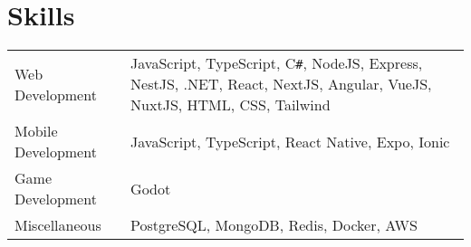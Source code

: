 \documentclass[a4paper,12pt]{article}
\begin{document}
\section{Skills}
\begin{tabularx}{\linewidth}{@{}l X@{}}
Web Development & \normalsize{JavaScript, TypeScript, C{\texttt{\#}}, NodeJS, Express, NestJS, .NET, React, NextJS, Angular, VueJS, NuxtJS, HTML, CSS, Tailwind}\\
Mobile Development & \normalsize{JavaScript, TypeScript, React Native, Expo, Ionic}\\
Game Development & \normalsize{Godot}\\
Miscellaneous  &  \normalsize{PostgreSQL, MongoDB, Redis, Docker, AWS}\\  
\end{tabularx}

\vfill
{}
\end{document}
